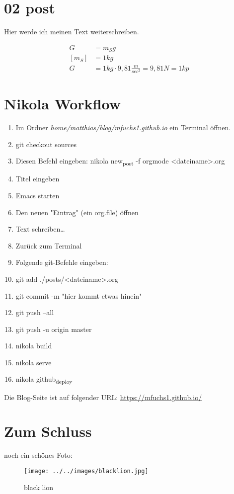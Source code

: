 \documentclass[pdftex,a4paper,12pt,bibliography=totoc,draft]{scrartcl}
\author{Matthias Fuchs}
\date{\today}
\title{}
\begin{document}
\tableofcontents

\section{02 post}
\label{sec:org1d437fd}
Hier werde ich meinen Text weiterschreiben.

\begin{align}
  G &= m_{S} g\\
  [m_{S}] &= 1 kg\\
  G &= 1 kg \cdot 9,81 \frac{m}{sec^2} = 9,81 N = 1 kp
\end{align}


\section{Nikola Workflow}
\label{sec:org81795e8}

\begin{enumerate}
\item Im Ordner \emph{home/matthias/blog/mfuchs1.github.io} ein Terminal öffnen.
\item git checkout sources
\item Diesen Befehl eingeben: nikola new\textsubscript{post} -f orgmode <dateiname>.org
\item Titel eingeben
\item Emacs starten
\item Den neuen "Eintrag" (ein org.file) öffnen
\item Text schreiben\ldots{}
\item Zurück zum Terminal
\item Folgende git-Befehle eingeben:
\item git add ./posts/<dateiname>.org
\item git commit -m "hier kommt etwas hinein"
\item git push --all
\item git push -u origin master
\item nikola build
\item nikola serve
\item nikola github\textsubscript{deploy}
\end{enumerate}

Die Blog-Seite ist auf folgender URL: \url{https://mfuchs1.github.io/}

\section{Zum Schluss}
\label{sec:org821980d}
noch ein schönes Foto:

\begin{figure}[htbp]
\centering
\texttt{[image: ../../images/blacklion.jpg]}
\caption{\label{fig:org69650e5}black lion}
\end{figure}
\end{document}
